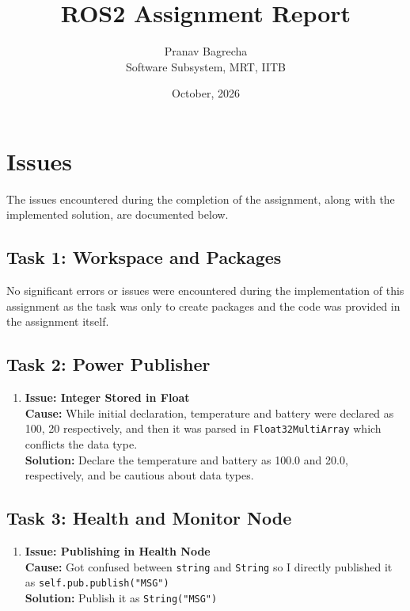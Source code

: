 \documentclass[12pt,a4paper]{article}
\title{ROS2 Assignment Report}
\author{Pranav Bagrecha \\ Software Subsystem, MRT, IITB}
\date{October, 2026}
\begin{document}
\maketitle

\section{Issues}
The issues encountered during the completion of the assignment, along with the implemented solution, are documented below.

\subsection{Task 1: Workspace and Packages}
No significant errors or issues were encountered during the implementation of this assignment as the task was only to create packages and the code was provided in the assignment itself.

\subsection{Task 2: Power Publisher}
\begin{enumerate}[leftmargin=*]
    \item \textbf{Issue: Integer Stored in Float}\\
    \textbf{Cause:} While initial declaration, temperature and battery were declared as 100, 20 respectively, and then it was parsed in \texttt{Float32MultiArray} which conflicts the data type.\\
    \textbf{Solution:} Declare the temperature and battery as 100.0 and 20.0, respectively, and be cautious about data types.
\end{enumerate}

\subsection{Task 3: Health and Monitor Node}
\begin{enumerate}[leftmargin=*]
    \item \textbf{Issue: Publishing in Health Node}\\
    \textbf{Cause:} Got confused between \texttt{string} and \texttt{String} so I directly published it as \texttt{self.pub.publish("MSG")}\\
    \textbf{Solution:} Publish it as \texttt{String("MSG")}
\end{enumerate}
\end{document}
